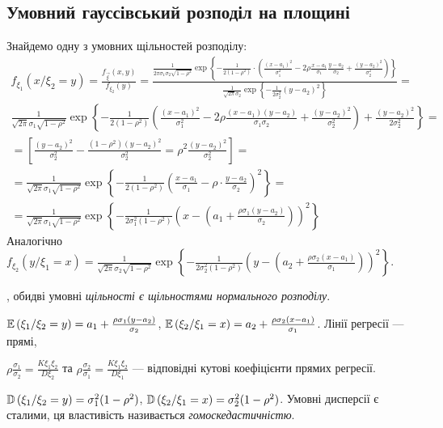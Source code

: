 \subsection{Умовний гауссівський розподіл на площині}
Знайдемо одну з умовних щільностей розподілу:
\begin{gather*}
    f_{\xi_1}(x/\xi_2 = y) = \frac{f_{\vec{\xi}}(x,y)}{f_{\xi_2}(y)} = 
    \frac{\frac{1}{2\pi\sigma_1\sigma_2\sqrt{1-\rho^2}} \exp\left\{
        -\frac{1}{2(1-\rho^2)}\cdot
        \left(\frac{(x-a_1)^2}{\sigma_1^2} -
        2\rho\frac{x-a_1}{\sigma_1}\frac{y-a_2}{\sigma_2} +
        \frac{(y-a_2)^2}{\sigma_2^2}
        \right)\right\} }{
            \frac{1}{\sqrt{2\pi}\sigma_2} \exp\left\{-\frac{1}{2\sigma_2^2}(y-a_2)^2\right\}
        } = \\
        \frac{1}{\sqrt{2\pi}\sigma_1\sqrt{1-\rho^2}} \exp\left\{
            -\frac{1}{2(1-\rho^2)}
        \left(\frac{(x-a_1)^2}{\sigma_1^2} -
        2\rho\frac{(x-a_1)(y-a_2)}{\sigma_1\sigma_2} +
        \frac{(y-a_2)^2}{\sigma_2^2}
        \right) +
        \frac{(y-a_2)^2}{2\sigma_2^2}
        \right\} = \\
        = \left [ \frac{(y-a_2)^2}{\sigma_2^2} - \frac{(1-\rho^2)(y-a_2)^2}{\sigma_2^2} = \rho^2 \frac{(y-a_2)^2}{\sigma_2^2}\right]=\\
        = \frac{1}{\sqrt{2\pi}\sigma_1\sqrt{1-\rho^2}} \exp\left\{-\frac{1}{2(1-\rho^2)}\left( \frac{x-a_1}{\sigma_1} - \rho\cdot\frac{y-a_2}{\sigma_2}\right)^2\right\} = \\
        = \frac{1}{\sqrt{2\pi}\sigma_1\sqrt{1-\rho^2}} \exp\left\{-\frac{1}{2\sigma_1^2(1-\rho^2)}\left( x- \left( a_1 + \frac{\rho\sigma_1(y-a_2)}{\sigma_2}\right)\right)^2\right\}
\end{gather*}
Аналогічно $f_{\xi_2}(y/\xi_1 = x) = \frac{1}{\sqrt{2\pi}\sigma_2\sqrt{1-\rho^2}} \exp\left\{-\frac{1}{2\sigma_2^2(1-\rho^2)}\left( y- \left( a_2 + \frac{\rho\sigma_2(x-a_1)}{\sigma_1}\right)\right)^2\right\}$.
\vspace{0.5em}

, обидві умовні \emph{щільності є щільностями нормального розподілу}.

$\mathbb{E}\left( \xi_1 / \xi_2 = y\right) = a_1 + \frac{\rho\sigma_1(y-a_2)}{\sigma_2}$, 
$\mathbb{E}\left( \xi_2 / \xi_1 = x\right) = a_2 + \frac{\rho\sigma_2(x-a_1)}{\sigma_1}$. Лінії регресії --- прямі,

\noindent
$\rho\frac{\sigma_1}{\sigma_2} = \frac{K\xi_1\xi_2}{D\xi_2}$ та $\rho\frac{\sigma_2}{\sigma_1}  = \frac{K\xi_1\xi_2}{D\xi_1}$ --- відповідні кутові коефіцієнти прямих регресії.

$\mathbb{D}\left( \xi_1 / \xi_2 = y\right) = \sigma_1^2(1-\rho^2)$, 
$\mathbb{D}\left( \xi_2 / \xi_1 = x\right) = \sigma_2^2(1-\rho^2)$. Умовні дисперсії є сталими, ця властивість називається \emph{гомоскедастичністю}.
